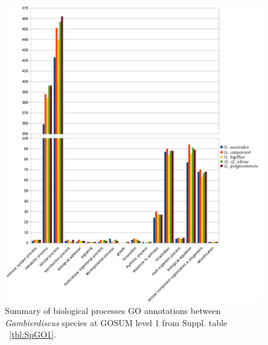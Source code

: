 \documentclass[12pt]{article}
\begin{document}
\begin{figure} 
\includegraphics[scale=.7]{3Aug18_cluster-investigation/figures/gosum-species/Species-gosum1-bio-split.png} 
\caption{Summary of biological processes GO annotations between \textit{Gambierdiscus} species at GOSUM level 1 from Suppl. table ~\ref{tbl:SpGO1}.} 
\label{fig:SpecGo1Bio}
\end{figure} 
\FloatBarrier
\end{document}
